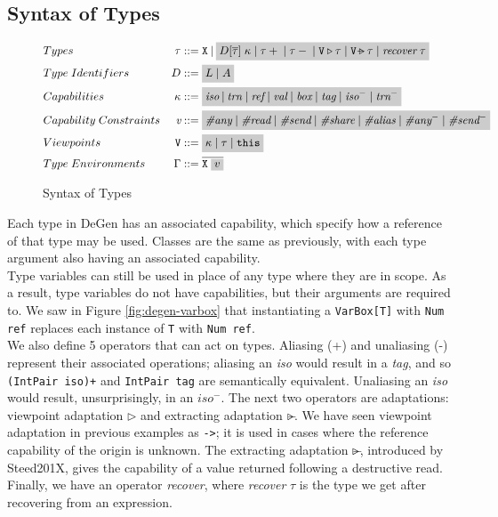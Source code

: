 \subsection{Syntax of Types}

\begin{figure}[H]
    \centering
    \begin{align*}
        &Types & \tau &::= \texttt{X} \: | \: \highlight{D[\overline{\tau}] \; \kappa \; | \; \tau+ \; | \; \tau- \; | \; \texttt{V}\triangleright\tau \; | \; \texttt{V}\extract\tau \; | \; \textit{recover} \; \tau} \\
        &Type \; Identifiers & D &::= \highlight{L \; | \; A} \\
        &Capabilities & \kappa &::= \highlight{\textit{iso} \: | \: \textit{trn} \; | \; \textit{ref} \; | \; \textit{val} \; | \; \textit{box} \; | \; \textit{tag} \; | \; \textit{iso}^- \; | \; \textit{trn}^-} \\
        &Capability \; Constraints & \textit{v} &::= \highlight{\textit{\#any} \; | \; \textit{\#read} \; | \; \textit{\#send} \; | \; \textit{\#share} \; | \; \textit{\#alias} \; | \; \textit{\#any}^- \; | \; \textit{\#send}^-} \\
        &Viewpoints & \texttt{V} &::= \highlight{\kappa \; | \; \tau \; | \; \texttt{this}} \\
        &Type \; Environments & \Gamma &::= \overline{\texttt{X} \; \highlight{v}}
    \end{align*}
    \caption{Syntax of Types}
    \label{fig:degen-types}
\end{figure}

Each type in DeGen has an associated capability, which specify how a reference of that type may be used. Classes are the same as previously, with each type argument also having an associated capability. \\

Type variables can still be used in place of any type where they are in scope. As a result, type variables do not have capabilities, but their arguments are required to. We saw in Figure \ref{fig:degen-varbox} that instantiating a \texttt{VarBox[T]} with \texttt{Num ref} replaces each instance of \texttt{T} with \texttt{Num ref}. \\

We also define 5 operators that can act on types. Aliasing (+) and unaliasing (-) represent their associated operations; aliasing an \textit{iso} would result in a \textit{tag}, and so \texttt{(IntPair iso)+} and \texttt{IntPair tag} are semantically equivalent. Unaliasing an \textit{iso} would result, unsurprisingly, in an $\textit{iso}^-$. The next two operators are adaptations: viewpoint adaptation $\triangleright$ and extracting adaptation $\extract$. We have seen viewpoint adaptation in previous examples as \texttt{->}; it is used in cases where the reference capability of the origin is unknown. The extracting adaptation $\extract$, introduced by Steed201X, gives the capability of a value returned following a destructive read. Finally, we have an operator \textit{recover}, where \textit{recover} $\tau$ is the type we get after recovering from an expression. \\


